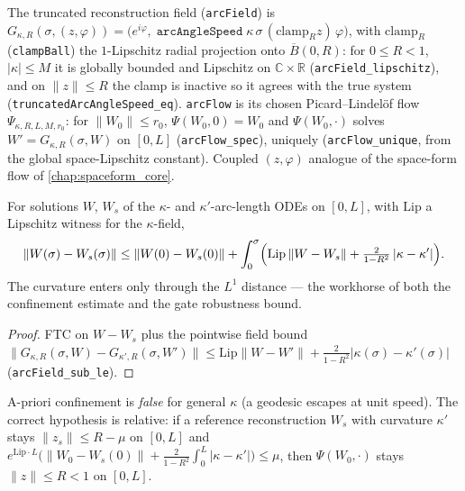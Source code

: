 \begin{definition}
  \label{def:arc_flow}
  The truncated reconstruction field (\texttt{arcField}) is
  $G_{\kappa,R}(\sigma,(z,\varphi)) = \bigl(e^{i\varphi},\;
  \texttt{arcAngleSpeed}\;\kappa\,\sigma\,(\mathrm{clamp}_R z)\,\varphi\bigr)$,
  with $\mathrm{clamp}_R$ (\texttt{clampBall}) the $1$-Lipschitz radial
  projection onto $\overline B(0,R)$: for $0\le R<1$, $|\kappa|\le M$ it is
  globally bounded and Lipschitz on $\mathbb C\times\mathbb R$
  (\texttt{arcField\_lipschitz}), and on $\|z\|\le R$ the clamp is inactive so
  it agrees with the true system (\texttt{truncatedArcAngleSpeed\_eq}).
  \texttt{arcFlow} is its chosen Picard--Lindelöf flow
  $\Psi_{\kappa,R,L,M,r_0}$: for $\|W_0\|\le r_0$, $\Psi(W_0,0)=W_0$ and
  $\Psi(W_0,\cdot)$ solves $W'=G_{\kappa,R}(\sigma,W)$ on $[0,L]$
  (\texttt{arcFlow\_spec}), uniquely (\texttt{arcFlow\_unique}, from the global
  space-Lipschitz constant). Coupled $(z,\varphi)$ analogue of the space-form
  flow of \cref{chap:spaceform_core}.
\end{definition}

\begin{lemma}
  \label{lem:arc_trajectory_diff_bound}
  For solutions $W$, $W_s$ of the $\kappa$- and $\kappa'$-arc-length ODEs on
  $[0,L]$, with $\mathrm{Lip}$ a Lipschitz witness for the $\kappa$-field,
  \[
    \|W(\sigma)-W_s(\sigma)\| \le \|W(0)-W_s(0)\|
    + \int_0^{\sigma}\Bigl(\mathrm{Lip}\,\|W-W_s\|
      + \tfrac{2}{1-R^2}\,|\kappa-\kappa'|\Bigr).
  \]
  The curvature enters only through the $L^1$ distance — the workhorse of both
  the confinement estimate and the gate robustness bound.
\end{lemma}

\begin{proof}
\leanok
  FTC on $W-W_s$ plus the pointwise field bound
  $\|G_{\kappa,R}(\sigma,W)-G_{\kappa',R}(\sigma,W')\|\le
  \mathrm{Lip}\|W-W'\|+\tfrac{2}{1-R^2}|\kappa(\sigma)-\kappa'(\sigma)|$
  (\texttt{arcField\_sub\_le}).
\end{proof}

\begin{lemma}
  \label{lem:arc_flow_confined}
  A-priori confinement is \emph{false} for general $\kappa$ (a geodesic escapes
  at unit speed). The correct hypothesis is relative: if a reference
  reconstruction $W_s$ with curvature $\kappa'$ stays $\|z_s\|\le R-\mu$ on
  $[0,L]$ and $e^{\mathrm{Lip}\cdot L}\bigl(\|W_0-W_s(0)\|
  +\tfrac{2}{1-R^2}\int_0^L|\kappa-\kappa'|\bigr)\le\mu$, then
  $\Psi(W_0,\cdot)$ stays $\|z\|\le R<1$ on $[0,L]$.
\end{lemma}

